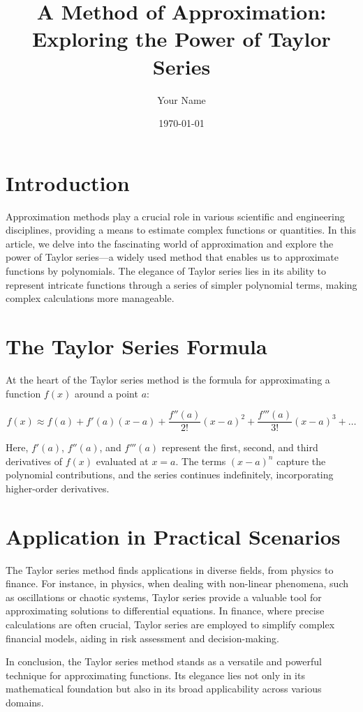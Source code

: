 \documentclass{article}
\begin{document}
\title{A Method of Approximation: Exploring the Power of Taylor Series}
\author{Your Name}
\date{\today}

\maketitle

\section{Introduction}

Approximation methods play a crucial role in various scientific and engineering disciplines, providing a means to estimate complex functions or quantities. In this article, we delve into the fascinating world of approximation and explore the power of Taylor series—a widely used method that enables us to approximate functions by polynomials. The elegance of Taylor series lies in its ability to represent intricate functions through a series of simpler polynomial terms, making complex calculations more manageable.

\section{The Taylor Series Formula}

At the heart of the Taylor series method is the formula for approximating a function $f(x)$ around a point $a$:

\begin{equation}
    f(x) \approx f(a) + f'(a)(x - a) + \frac{f''(a)}{2!}(x - a)^2 + \frac{f'''(a)}{3!}(x - a)^3 + \ldots
\end{equation}

Here, $f'(a)$, $f''(a)$, and $f'''(a)$ represent the first, second, and third derivatives of $f(x)$ evaluated at $x = a$. The terms $(x - a)^n$ capture the polynomial contributions, and the series continues indefinitely, incorporating higher-order derivatives.

\section{Application in Practical Scenarios}

The Taylor series method finds applications in diverse fields, from physics to finance. For instance, in physics, when dealing with non-linear phenomena, such as oscillations or chaotic systems, Taylor series provide a valuable tool for approximating solutions to differential equations. In finance, where precise calculations are often crucial, Taylor series are employed to simplify complex financial models, aiding in risk assessment and decision-making.

In conclusion, the Taylor series method stands as a versatile and powerful technique for approximating functions. Its elegance lies not only in its mathematical foundation but also in its broad applicability across various domains.
\end{document}
